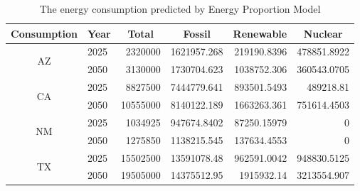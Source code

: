 \begin{table}[htbp]
	\centering
	\caption{The energy consumption  predicted by Energy Proportion Model}
	\label{my-label}
	\begin{tabular}{|c|l|r|r|r|r|}
		\hline
		Consumption         & \multicolumn{1}{c|}{Year} & \multicolumn{1}{c|}{Total} & \multicolumn{1}{c|}{Fossil} & \multicolumn{1}{c|}{Renewable} & \multicolumn{1}{c|}{Nuclear} \\ \hline
		\multirow{2}{*}{AZ} & 2025                      & 2320000                    & 1621957.268                 & 219190.8396                    & 478851.8922                  \\ \cline{2-6} 
		& 2050                      & 3130000                    & 1730704.623                 & 1038752.306                    & 360543.0705                  \\ \hline
		\multirow{2}{*}{CA} & 2025                      & 8827500                    & 7444779.641                 & 893501.5493                    & 489218.81                    \\ \cline{2-6} 
		& 2050                      & 10555000                   & 8140122.189                 & 1663263.361                    & 751614.4503                  \\ \hline
		\multirow{2}{*}{NM} & 2025                      & 1034925                    & 947674.8402                 & 87250.15979                    & 0                            \\ \cline{2-6} 
		& 2050                      & 1275850                    & 1138215.545                 & 137634.4553                    & 0                            \\ \hline
		\multirow{2}{*}{TX} & 2025                      & 15502500                   & 13591078.48                 & 962591.0042                    & 948830.5125                  \\ \cline{2-6} 
		& 2050                      & 19505000                   & 14375512.95                 & 1915932.14                     & 3213554.907                  \\ \hline
	\end{tabular}
	\label{tab:ProPredict}%
\end{table}
